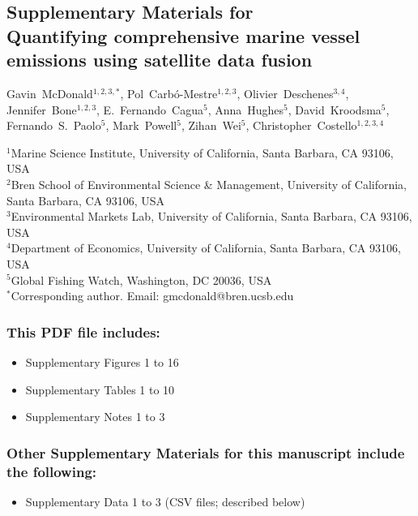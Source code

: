 \begin{center}
\section*{Supplementary Materials for\\ Quantifying comprehensive marine vessel emissions using satellite data fusion}

Gavin~McDonald$^{1,2,3,\ast}$,
Pol~Carbó-Mestre$^{1,2,3}$,
Olivier~Deschenes$^{3,4}$,
Jennifer~Bone$^{1,2,3}$,
E.~Fernando~Cagua$^{5}$,
Anna~Hughes$^{5}$,
David~Kroodsma$^{5}$,
Fernando~S.~Paolo$^{5}$,
Mark~Powell$^{5}$,
Zihan~Wei$^{5}$,
Christopher~Costello$^{1,2,3,4}$

\medskip
{\small
$^{1}$Marine Science Institute, University of California, Santa Barbara, CA 93106, USA\\
$^{2}$Bren School of Environmental Science \& Management, University of California, Santa Barbara, CA 93106, USA\\
$^{3}$Environmental Markets Lab, University of California, Santa Barbara, CA 93106, USA\\
$^{4}$Department of Economics, University of California, Santa Barbara, CA 93106, USA\\
$^{5}$Global Fishing Watch, Washington, DC 20036, USA\\[4pt]
$^{\ast}$Corresponding author. Email: gmcdonald@bren.ucsb.edu}
\end{center}

\newpage

\subsubsection*{This PDF file includes:}
\begin{itemize}
    \item Supplementary Figures 1 to 16
    \item Supplementary Tables 1 to 10
    \item Supplementary Notes 1 to 3
\end{itemize}

\subsubsection*{Other Supplementary Materials for this manuscript include the following:}
\begin{itemize}
    \item Supplementary Data 1 to 3 (CSV files; described below)
\end{itemize}

